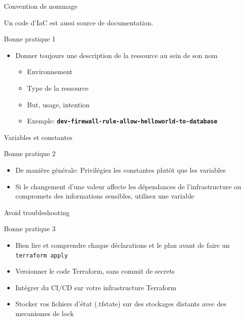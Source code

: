 \documentclass[aspectratio=169,10pt]{beamer}
\begin{document}
\begin{frame}{Convention de nommage}

Un code d'IaC est aussi source de documentation.

\begin{alertblock}{Bonne pratique 1}
\begin{itemize}
    \item Donner toujours une description de la ressource au sein de son nom
    \begin{itemize}
        \item Environnement
        \item Type de la ressource 
        \item But, usage, intention
        \item Exemple: \texttt{\textbf{dev-firewall-rule-allow-helloworld-to-database}}
    \end{itemize}
\end{itemize}
\end{alertblock}
\end{frame}


\begin{frame}{Variables et constantes}

\begin{alertblock}{Bonne pratique 2}
\begin{itemize}
    \item De manière générale: Privilégiez les constantes plutôt que les variables
    \item Si le changement d'une valeur affecte les dépendances de l'infrastructure ou compromets des informations sensibles, utilisez une variable
\end{itemize}
\end{alertblock}

\end{frame}

\begin{frame}{Avoid troubleshooting}

\begin{alertblock}{Bonne pratique 3}
\begin{itemize}
    \item Bien lire et comprendre chaque déclarations et le plan avant de faire un \texttt{terraform apply}
    \item Versionner le code Terraform, sans commit de secrets
    \item Intégrer du CI/CD sur votre infrastructure Terraform
    \item Stocker vos fichiers d'état (.tfstate) sur des stockages distants avec des mecanismes de lock
\end{itemize}
\end{alertblock}

\end{frame}
\end{document}
